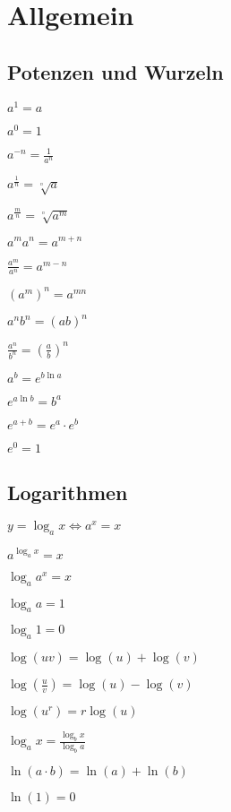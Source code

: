 
\section{Allgemein}

\subsection{Potenzen und Wurzeln}
\begin{compactitem}
    \item
        \begin{inparaitem}
            \item $a^1 = a$
            \item $a^0 = 1$
        \end{inparaitem}
    \item $a^{-n} = \frac{1}{a^n}$
    \item
        \begin{inparaitem}
            \item $a^{\frac{1}{n}} = \sqrt[^n]{a}$
            \item $a^{\frac{m}{n}} = \sqrt[^n]{a^m}$
        \end{inparaitem}
    \item $a^ma^n = a^{m + n}$
    \item $\frac{a^m}{a^n} = a^{m - n}$
    \item $(a^m)^n = a^{m n}$
    \item $a^nb^n = (ab)^n$
    \item $\frac{a^n}{b^n} = \left( \frac{a}{b} \right)^n$
    \item $a^b = e^{b \ln a}$
    \item $e^{a \ln b} = b^a$
    \item $e^{a + b} = e^a \cdot e^b$
    \item $e^0 = 1$
\end{compactitem}

\subsection{Logarithmen}
$y = \log_a x \iff a^x = x$
\begin{compactitem}
    \item $a^{\log_a x} = x$
    \item $\log_a a^x = x$
    \item
        \begin{inparaitem}
            \item $\log_a a = 1$
            \item $\log_a 1 = 0$
        \end{inparaitem}
    \item $\log(uv) = \log(u) + \log(v)$
    \item $\log(\frac{u}{v}) = \log(u) - \log(v)$
    \item $\log(u^r) = r \log(u)$
    \item $\log_a x = \frac{\log_b x}{\log_b a}$
    \item $\ln(a \cdot b) = \ln(a) + \ln(b)$
    \item $\ln(1) = 0$
\end{compactitem}

